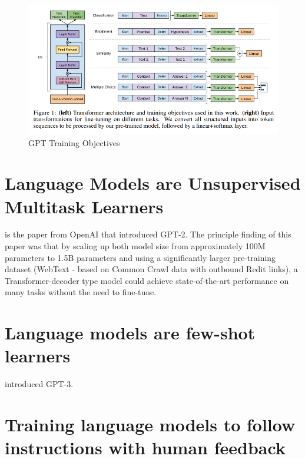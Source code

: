 \documentclass[11pt]{article}
\theoremstyle{definition}
\begin{document}
\begin{figure}
\centering
  \includegraphics[width=\textwidth,height=\textheight,keepaspectratio]{transformers/gpt_objectives.png}
  \caption{GPT Training Objectives \cite{radford2018gpt}}
  \label{fig:gptobjectives}
\end{figure}

\section{Language Models are Unsupervised Multitask Learners \cite{radford2019gpt2}}

\cite{radford2019gpt2} is the paper from OpenAI that introduced GPT-2. The principle finding of this paper was that by scaling up both model size from approximately 100M parameters to 1.5B parameters and using a significantly larger pre-training dataset (WebText - based on Common Crawl data with outbound Redit links), a Transformer-decoder type model could achieve state-of-the-art performance on many tasks without the need to fine-tune.

\section{Language models are few-shot learners \cite{brown2020gpt3}}

\cite{brown2020gpt3} introduced GPT-3.

\section{Training language models to follow instructions with human feedback \cite{ouyang2022training}}
\end{document}
